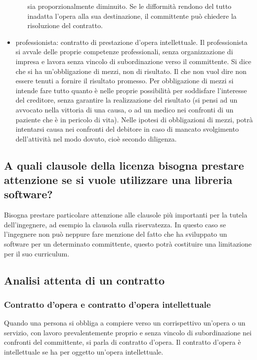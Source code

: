 \begin{itemize}
\begin{itemize}
        sia proporzionalmente diminuito. Se le difformità rendono del tutto inadatta l'opera alla sua destinazione, il committente può chiedere la
        risoluzione del contratto.
    \end{itemize}
    \item professionista: contratto di prestazione d'opera intellettuale. Il professionista si avvale delle proprie competenze professionali,
    senza organizzazione di impresa e lavora senza vincolo di subordinazione verso il committente.\newline
    Si dice che si ha un'obbligazione di mezzi, non di risultato. Il che non vuol dire non essere tenuti a fornire il risultato promesso. Per obbligazione
    di mezzi si intende fare tutto quanto è nelle proprie possibilità per soddisfare l'interesse del creditore, senza garantire la realizzazione
    del risultato (si pensi ad un avvocato nella vittoria di una causa, o ad un medico nei confronti di un paziente che è in pericolo di vita).\newline
    Nelle ipotesi di obbligazioni di mezzi, potrà intentarsi causa nei confronti del debitore in caso di mancato svolgimento dell'attività nel modo
    dovuto, cioè secondo diligenza.
\end{itemize}

\subsection{A quali clausole della licenza bisogna prestare attenzione se si vuole utilizzare una libreria software?}
Bisogna prestare particolare attenzione alle clausole più importanti per la tutela dell'ingegnere, ad esempio la clausola sulla riservatezza. In questo caso se
l'ingegnere non può neppure fare menzione del fatto che ha sviluppato un software per un determinato committente, questo potrà costituire una
limitazione per il suo curriculum.

\subsection{Analisi attenta di un contratto}
\subsubsection{Contratto d'opera e contratto d'opera intellettuale}
Quando una persona si obbliga a compiere verso un corrispettivo un'opera o un servizio, con lavoro prevalentemente proprio e senza vincolo di subordinazione
nei confronti del committente, si parla di contratto d'opera. \newline
Il contratto d'opera è intellettuale se ha per oggetto un'opera intellettuale.
